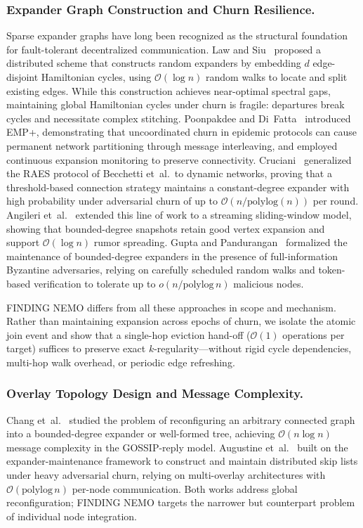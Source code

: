 \documentclass[runningheads]{llncs}
\begin{document}
\subsubsection{Expander Graph Construction and Churn Resilience.}
Sparse expander graphs have long been recognized as the structural foundation for fault-tolerant decentralized communication. Law and Siu~\cite{lawDistributedConstructionRandom2003} proposed a distributed scheme that constructs random expanders by embedding $d$ edge-disjoint Hamiltonian cycles, using $\mathcal{O}(\log n)$ random walks to locate and split existing edges. While this construction achieves near-optimal spectral gaps, maintaining global Hamiltonian cycles under churn is fragile: departures break cycles and necessitate complex stitching. Poonpakdee and Di~Fatta~\cite{poonpakdeeRobustEfficientMembership2017} introduced EMP+, demonstrating that uncoordinated churn in epidemic protocols can cause permanent network partitioning through message interleaving, and employed continuous expansion monitoring to preserve connectivity. Cruciani~\cite{crucianiMaintainingBoundedDegree2025} generalized the RAES protocol of Becchetti et~al.\ to dynamic networks, proving that a threshold-based connection strategy maintains a constant-degree expander with high probability under adversarial churn of up to $\mathcal{O}(n / \text{polylog}(n))$ per round. Angileri et~al.~\cite{angileriThresholdDrivenStreamingGraph2025} extended this line of work to a streaming sliding-window model, showing that bounded-degree snapshots retain good vertex expansion and support $\mathcal{O}(\log n)$ rumor spreading. Gupta and Pandurangan~\cite{guptaFullyDistributedProtocolConstructing2025} formalized the maintenance of bounded-degree expanders in the presence of full-information Byzantine adversaries, relying on carefully scheduled random walks and token-based verification to tolerate up to $o(n / \text{polylog}\,n)$ malicious nodes.

FINDING NEMO differs from all these approaches in scope and mechanism. Rather than maintaining expansion across epochs of churn, we isolate the atomic join event and show that a single-hop eviction hand-off ($\mathcal{O}(1)$ operations per target) suffices to preserve exact $k$-regularity---without rigid cycle dependencies, multi-hop walk overhead, or periodic edge refreshing.

\subsubsection{Overlay Topology Design and Message Complexity.}
Chang et~al.~\cite{changOverlayNetworkConstruction2025} studied the problem of reconfiguring an arbitrary connected graph into a bounded-degree expander or well-formed tree, achieving $\mathcal{O}(n \log n)$ message complexity in the GOSSIP-reply model. Augustine et~al.~\cite{augustineHighlyDynamicFully2025} built on the expander-maintenance framework to construct and maintain distributed skip lists under heavy adversarial churn, relying on multi-overlay architectures with $\mathcal{O}(\text{polylog}\,n)$ per-node communication. Both works address global reconfiguration; FINDING NEMO targets the narrower but counterpart problem of individual node integration.
\end{document}

